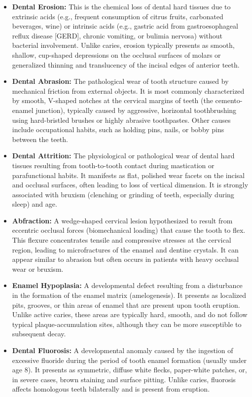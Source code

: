 \begin{itemize}
    \item \textbf{Dental Erosion:} This is the chemical loss of dental hard tissues due to extrinsic acids (e.g., frequent consumption of citrus fruits, carbonated beverages, wine) or intrinsic acids (e.g., gastric acid from gastroesophageal reflux disease [GERD], chronic vomiting, or bulimia nervosa) without bacterial involvement. Unlike caries, erosion typically presents as smooth, shallow, cup-shaped depressions on the occlusal surfaces of molars or generalized thinning and translucency of the incisal edges of anterior teeth.
    \item \textbf{Dental Abrasion:} The pathological wear of tooth structure caused by mechanical friction from external objects. It is most commonly characterized by smooth, V-shaped notches at the cervical margins of teeth (the cemento-enamel junction), typically caused by aggressive, horizontal toothbrushing using hard-bristled brushes or highly abrasive toothpastes. Other causes include occupational habits, such as holding pins, nails, or bobby pins between the teeth.
    \item \textbf{Dental Attrition:} The physiological or pathological wear of dental hard tissues resulting from tooth-to-tooth contact during mastication or parafunctional habits. It manifests as flat, polished wear facets on the incisal and occlusal surfaces, often leading to loss of vertical dimension. It is strongly associated with bruxism (clenching or grinding of teeth, especially during sleep) and age.
    \item \textbf{Abfraction:} A wedge-shaped cervical lesion hypothesized to result from eccentric occlusal forces (biomechanical loading) that cause the tooth to flex. This flexure concentrates tensile and compressive stresses at the cervical region, leading to microfractures of the enamel and dentine crystals. It can appear similar to abrasion but often occurs in patients with heavy occlusal wear or bruxism.
    \item \textbf{Enamel Hypoplasia:} A developmental defect resulting from a disturbance in the formation of the enamel matrix (amelogenesis). It presents as localized pits, grooves, or thin areas of enamel that are present upon tooth eruption. Unlike active caries, these areas are typically hard, smooth, and do not follow typical plaque-accumulation sites, although they can be more susceptible to subsequent decay.
    \item \textbf{Dental Fluorosis:} A developmental anomaly caused by the ingestion of excessive fluoride during the period of tooth enamel formation (usually under age 8). It presents as symmetric, diffuse white flecks, paper-white patches, or, in severe cases, brown staining and surface pitting. Unlike caries, fluorosis affects homologous teeth bilaterally and is present from eruption.

\end{itemize}

